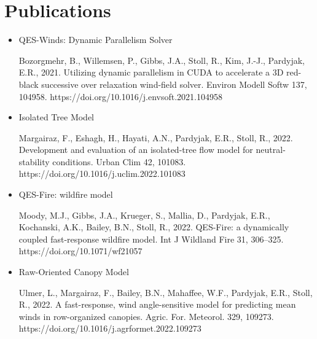 \section{Publications}

\begin{itemize}

\item QES-Winds: Dynamic Parallelism Solver

Bozorgmehr, B., Willemsen, P., Gibbs, J.A., Stoll, R., Kim, J.-J., Pardyjak, E.R., 2021. Utilizing dynamic parallelism in CUDA to accelerate a 3D red-black successive over relaxation wind-field solver. Environ Modell Softw 137, 104958. https://doi.org/10.1016/j.envsoft.2021.104958


\item Isolated Tree Model

Margairaz, F., Eshagh, H., Hayati, A.N., Pardyjak, E.R., Stoll, R., 2022. Development and evaluation of an isolated-tree flow model for neutral-stability conditions. Urban Clim 42, 101083. https://doi.org/10.1016/j.uclim.2022.101083

\item QES-Fire: wildfire model

Moody, M.J., Gibbs, J.A., Krueger, S., Mallia, D., Pardyjak, E.R., Kochanski, A.K., Bailey, B.N., Stoll, R., 2022. QES-Fire: a dynamically coupled fast-response wildfire model. Int J Wildland Fire 31, 306–325. https://doi.org/10.1071/wf21057

\item Raw-Oriented Canopy Model

Ulmer, L., Margairaz, F., Bailey, B.N., Mahaffee, W.F., Pardyjak, E.R., Stoll, R., 2022. A fast-response, wind angle-sensitive model for predicting mean winds in row-organized canopies. Agric. For. Meteorol. 329, 109273. https://doi.org/10.1016/j.agrformet.2022.109273

\end{itemize}
